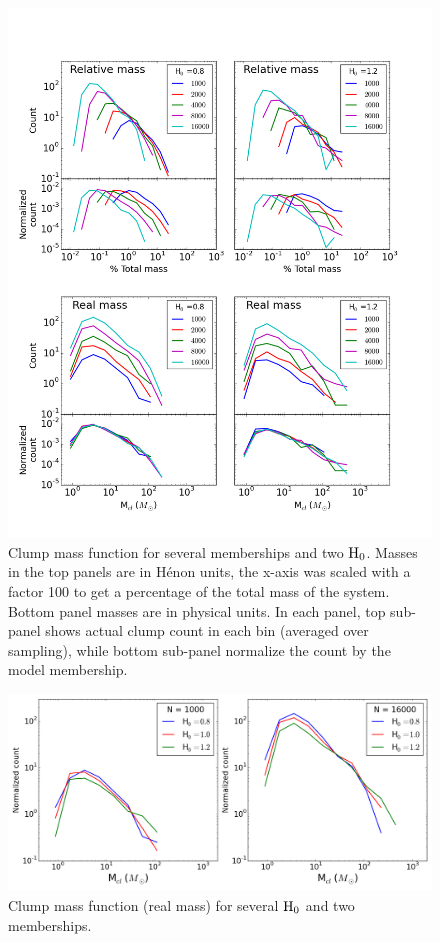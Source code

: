 \begin{figure}
\begin{center}
\includegraphics[width=\columnwidth]{Figures/2_ClumpMF_N.png}
\end{center}
\caption{Clump mass function for several memberships and two ${\textrm{H}}_0$. Masses in the top panels are in H\'enon units, the x-axis was scaled with a factor 100 to get a percentage of the total mass of the system. Bottom panel masses are in physical units. In each panel, top sub-panel shows actual clump count in each bin (averaged over sampling), while bottom sub-panel normalize the count by the model membership. }
\label{Fig:2_ClumpMF_N}
\end{figure} 

\begin{figure}
\begin{center}
\includegraphics[width=0.95\columnwidth]{Figures/2_ClumpMF_H.png}
\end{center}
\caption{Clump mass function (real mass) for several ${\textrm{H}}_0$  and two memberships.}
\label{Fig:2_ClumpMF_H}
\end{figure} 


